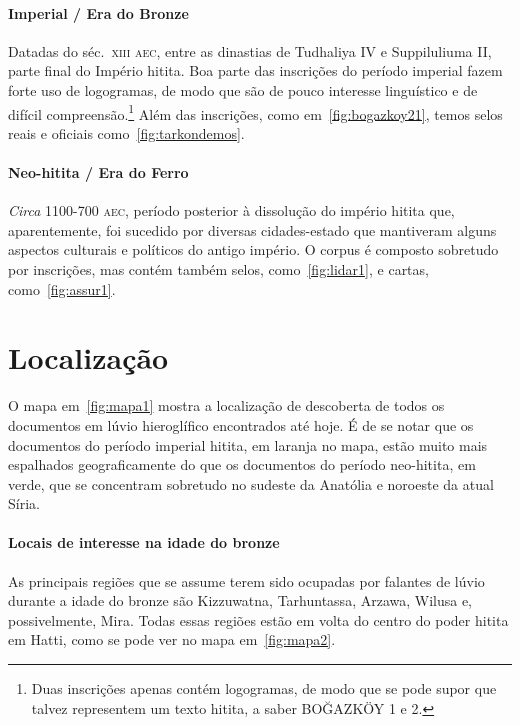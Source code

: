 \paragraph{Imperial \slash{} Era do Bronze} Datadas do séc.\ \textsc{xiii aec},
entre as dinastias de Tudhaliya IV e Suppiluliuma II, parte final do Império
hitita.
Boa parte das inscrições do período imperial fazem forte uso de logogramas,
de modo que são de pouco interesse linguístico e de difícil
compreensão.\footnote{Duas inscrições apenas contém logogramas, de modo que
	se pode supor que talvez representem um texto hitita, a saber BOĞAZKÖY 1 e 2.}
Além das inscrições, como em~\autoref{fig:bogazkoy21},
temos selos reais e oficiais
como~\autoref{fig:tarkondemos}.


\paragraph{Neo-hitita \slash{} Era do Ferro} \emph{Circa} 1100-700 \textsc{aec},
período posterior à dissolução do império hitita que, aparentemente, foi
sucedido por diversas cidades-estado que mantiveram alguns aspectos
culturais e políticos do antigo império.
O corpus é composto sobretudo por inscrições, mas contém também selos,
como~\autoref{fig:lidar1}, e cartas, como~\autoref{fig:assur1}.



\section{Localização}

O mapa em~\autoref{fig:mapa1} mostra a localização de descoberta de todos os
documentos em lúvio hieroglífico encontrados até hoje.
É de se notar que os documentos do período imperial hitita, em laranja no
mapa, estão muito mais espalhados geograficamente do que os documentos do
período neo-hitita, em verde, que se concentram sobretudo no sudeste da Anatólia
e noroeste da atual Síria.


\paragraph{Locais de interesse na idade do bronze}
As principais regiões que se assume terem sido ocupadas por falantes de lúvio
durante a idade do bronze são Kizzuwatna, Tarhuntassa, Arzawa, Wilusa e,
possivelmente, Mira.
Todas essas regiões estão em volta do centro do poder hitita em Hatti, como se
pode ver no mapa em~\autoref{fig:mapa2}.

